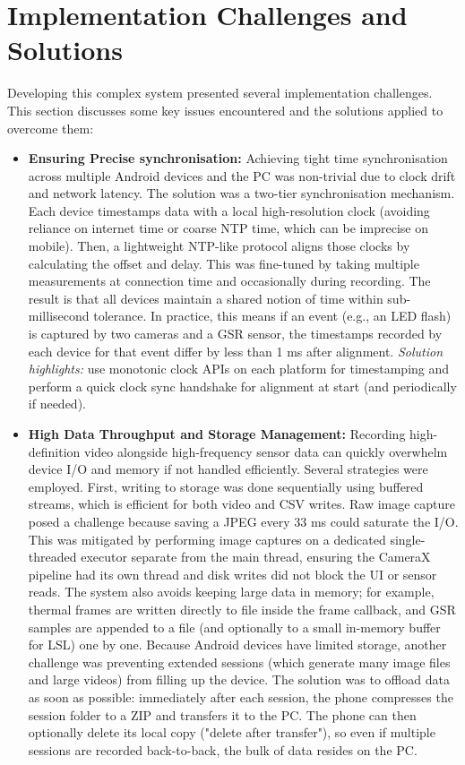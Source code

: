 \section{Implementation Challenges and Solutions}\label{sec:4-6}
Developing this complex system presented several implementation challenges. This section discusses some key issues encountered and the solutions applied to overcome them:

\begin{itemize}
  \item \textbf{Ensuring Precise synchronisation:} Achieving tight time synchronisation across multiple Android devices and the PC was non-trivial due to clock drift and network latency. The solution was a two-tier synchronisation mechanism. Each device timestamps data with a local high-resolution clock (avoiding reliance on internet time or coarse NTP time, which can be imprecise on mobile). Then, a lightweight NTP-like protocol aligns those clocks by calculating the offset and delay. This was fine-tuned by taking multiple measurements at connection time and occasionally during recording. The result is that all devices maintain a shared notion of time within sub-millisecond tolerance. In practice, this means if an event (e.g., an LED flash) is captured by two cameras and a GSR sensor, the timestamps recorded by each device for that event differ by less than 1 ms after alignment. \emph{Solution highlights:} use monotonic clock APIs on each platform for timestamping and perform a quick clock sync handshake for alignment at start (and periodically if needed).
  \item \textbf{High Data Throughput and Storage Management:} Recording high-definition video alongside high-frequency sensor data can quickly overwhelm device I/O and memory if not handled efficiently. Several strategies were employed. First, writing to storage was done sequentially using buffered streams, which is efficient for both video and CSV writes. Raw image capture posed a challenge because saving a JPEG every 33 ms could saturate the I/O. This was mitigated by performing image captures on a dedicated single-threaded executor separate from the main thread, ensuring the CameraX pipeline had its own thread and disk writes did not block the UI or sensor reads. The system also avoids keeping large data in memory; for example, thermal frames are written directly to file inside the frame callback, and GSR samples are appended to a file (and optionally to a small in-memory buffer for LSL) one by one. Because Android devices have limited storage, another challenge was preventing extended sessions (which generate many image files and large videos) from filling up the device. The solution was to offload data as soon as possible: immediately after each session, the phone compresses the session folder to a ZIP and transfers it to the PC. The phone can then optionally delete its local copy ("delete after transfer"), so even if multiple sessions are recorded back-to-back, the bulk of data resides on the PC.

\end{itemize}
